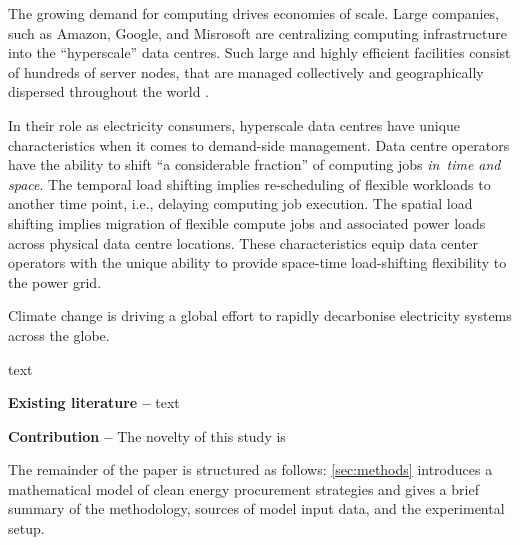 The growing demand for computing drives economies of scale. Large companies, such as Amazon, Google, and Misrosoft are centralizing computing infrastructure into the \enquote{hyperscale} data centres. 
Such large and highly efficient facilities consist of hundreds of server nodes, that are managed collectively and geographically dispersed throughout the world \cite{ThereAre500}. 

In their role as electricity consumers, hyperscale data centres have unique characteristics when it comes to demand-side management. Data centre operators have the ability to shift \enquote{a considerable fraction} of computing jobs \textit{in~time and space}. \cite{radovanovicIEEE2023} The temporal load shifting implies re-scheduling of flexible workloads to another time point, i.e., delaying computing job execution. The spatial load shifting implies migration of flexible compute jobs and associated power loads across physical data centre locations. These characteristics equip data center operators with the unique ability to provide space-time load-shifting flexibility to the power grid.

Climate change is driving a global effort to rapidly decarbonise electricity systems across the globe.

text


\textbf{Existing literature --}
text


\textbf{Contribution --} The novelty of this study is


The remainder of the paper is structured as follows: \cref{sec:methods} introduces a mathematical model of clean energy procurement strategies and gives a brief summary of the methodology, sources of model input data, and the experimental setup.
